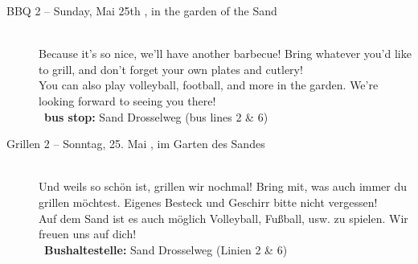 \begin{description}
\ifml
    \item[BBQ 2 -- Sunday, Mai 25th \YEAR, in the garden of the Sand]~\\
    Because it's so nice, we'll have another barbecue!
    Bring whatever you'd like to grill, and don’t forget your own plates and cutlery!\\
    You can also play volleyball, football, and more in the garden. We’re looking forward to seeing you there!\\
    ~\textbf{bus stop:} Sand Drosselweg (bus lines 2 \& 6)
\else
    \item[Grillen 2 -- Sonntag, 25. Mai \YEAR, im Garten des Sandes]~\\
    Und weils so schön ist, grillen wir nochmal!
    Bring mit, was auch immer du grillen möchtest. Eigenes Besteck und Geschirr bitte nicht vergessen!\\
    Auf dem Sand ist es auch möglich Volleyball, Fußball, usw. zu spielen. Wir freuen uns auf dich!\\
    ~\textbf{Bushaltestelle:} Sand Drosselweg (Linien 2 \& 6)
\fi



\end{description}

